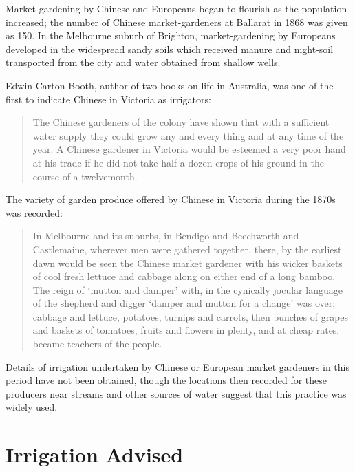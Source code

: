 Market-gardening by Chinese and Europeans began to flourish as the
population increased; the number of Chinese market-gardeners at
Ballarat in 1868 was given as 150.  In the Melbourne suburb
of Brighton, market-gardening by Europeans developed in the widespread
sandy soils which received manure and night-soil transported from the
city and water obtained from shallow wells.

Edwin Carton Booth, author of two books on life in Australia, was one
of the first to indicate Chinese in Victoria as irrigators:
\begin{quote}
	The Chinese gardeners of the colony have shown that with a
	sufficient water supply they could grow any and every thing
	and at any time of the year. A Chinese gardener in Victoria
	would be esteemed a very poor hand at his trade if he did not
	take half a dozen crops of his ground in the course of a
	twelvemonth.
\end{quote}

The variety of garden produce offered by Chinese in Victoria during
the 1870s was record\-ed:
\begin{quote}
	In Melbourne and its suburbs, in Bendigo and Beechworth and
	Castlemaine, wherever men were gathered together, there, by
	the earliest dawn would be seen the Chinese market gardener
	with his wicker baskets of cool fresh lettuce and cabbage
	along on either end of a long bamboo.  The reign of `mutton
	and damper' with, in the cynically jocular language of the
	shepherd and digger `damper and mutton for a change' was over;
	cabbage and lettuce, potatoes, turnips and carrots, then
	bunches of grapes and baskets of tomatoes, fruits and flowers
	in plenty, and at cheap rates. became teachers of the
	people.
\end{quote}

Details of irrigation undertaken by Chinese or European market
gardeners in this period have not been obtained, though the locations
then recorded for these producers near streams and other sources of
water suggest that this practice was widely used.

\section*{Irrigation Advised}

